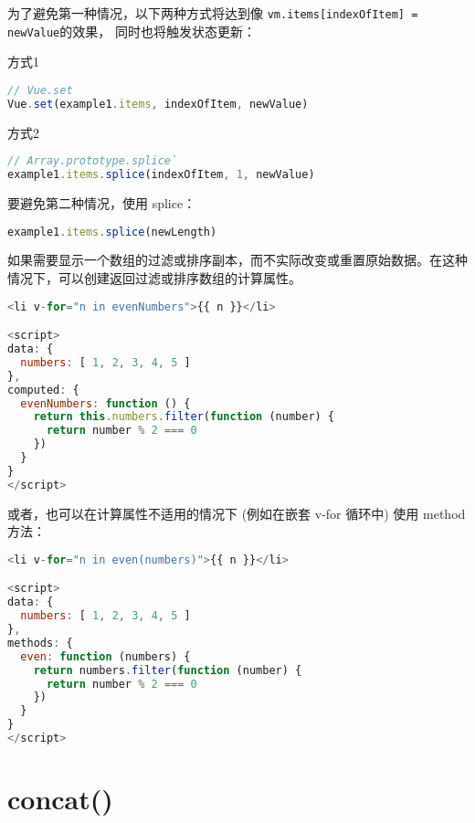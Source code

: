 为了避免第一种情况，以下两种方式将达到像 \texttt{vm.items[indexOfItem] = newValue}的效果， 同时也将触发状态更新：

\begin{compactitem}
\item 方式1

\begin{lstlisting}[language=JavaScript]
// Vue.set
Vue.set(example1.items, indexOfItem, newValue)
\end{lstlisting}

\item 方式2

\begin{lstlisting}[language=JavaScript]
// Array.prototype.splice`
example1.items.splice(indexOfItem, 1, newValue)
\end{lstlisting}

\end{compactitem}

要避免第二种情况，使用 splice：





\begin{lstlisting}[language=JavaScript]
example1.items.splice(newLength)
\end{lstlisting}

如果需要显示一个数组的过滤或排序副本，而不实际改变或重置原始数据。在这种情况下，可以创建返回过滤或排序数组的计算属性。

\begin{lstlisting}[language=JavaScript]
<li v-for="n in evenNumbers">{{ n }}</li>

<script>
data: {
  numbers: [ 1, 2, 3, 4, 5 ]
},
computed: {
  evenNumbers: function () {
    return this.numbers.filter(function (number) {
      return number % 2 === 0
    })
  }
}
</script>
\end{lstlisting}

或者，也可以在计算属性不适用的情况下 (例如在嵌套 v-for 循环中) 使用 method 方法：

\begin{lstlisting}[language=JavaScript]
<li v-for="n in even(numbers)">{{ n }}</li>

<script>
data: {
  numbers: [ 1, 2, 3, 4, 5 ]
},
methods: {
  even: function (numbers) {
    return numbers.filter(function (number) {
      return number % 2 === 0
    })
  }
}
</script>
\end{lstlisting}



\section{concat()}

